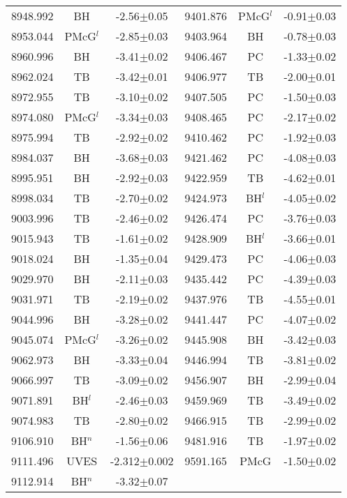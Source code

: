 \documentclass[a4paper,fleqn,usenatbib]{mnras}
\begin{document}
\begin{table}
\begin{tabular}{lcc|lcc}
8948.992 & BH     & -2.56$\pm$0.05   & 9401.876 &PMcG$^l$& -0.91$\pm$0.03   \\ 
8953.044 &PMcG$^l$& -2.85$\pm$0.03   & 9403.964 & BH     & -0.78$\pm$0.03   \\ 
8960.996 & BH     & -3.41$\pm$0.02   & 9406.467 & PC     & -1.33$\pm$0.02   \\ 
8962.024 & TB     & -3.42$\pm$0.01   & 9406.977 & TB     & -2.00$\pm$0.01   \\ 
8972.955 & TB     & -3.10$\pm$0.02   & 9407.505 & PC     & -1.50$\pm$0.03   \\ 
8974.080 &PMcG$^l$& -3.34$\pm$0.03   & 9408.465 & PC     & -2.17$\pm$0.02   \\ 
8975.994 & TB     & -2.92$\pm$0.02   & 9410.462 & PC     & -1.92$\pm$0.03   \\ 
8984.037 & BH     & -3.68$\pm$0.03   & 9421.462 & PC     & -4.08$\pm$0.03   \\ 
8995.951 & BH     & -2.92$\pm$0.03   & 9422.959 & TB     & -4.62$\pm$0.01   \\ 
8998.034 & TB     & -2.70$\pm$0.02   & 9424.973 & BH$^l$ & -4.05$\pm$0.02   \\ 
9003.996 & TB     & -2.46$\pm$0.02   & 9426.474 & PC     & -3.76$\pm$0.03   \\ 
9015.943 & TB     & -1.61$\pm$0.02   & 9428.909 & BH$^l$ & -3.66$\pm$0.01   \\ 
9018.024 & BH     & -1.35$\pm$0.04   & 9429.473 & PC     & -4.06$\pm$0.03   \\ 
9029.970 & BH     & -2.11$\pm$0.03   & 9435.442 & PC     & -4.39$\pm$0.03   \\ 
9031.971 & TB     & -2.19$\pm$0.02   & 9437.976 & TB     & -4.55$\pm$0.01   \\ 
9044.996 & BH     & -3.28$\pm$0.02   & 9441.447 & PC     & -4.07$\pm$0.02   \\ 
9045.074 &PMcG$^l$& -3.26$\pm$0.02   & 9445.908 & BH     & -3.42$\pm$0.03   \\ 
9062.973 & BH     & -3.33$\pm$0.04   & 9446.994 & TB     & -3.81$\pm$0.02   \\ 
9066.997 & TB     & -3.09$\pm$0.02   & 9456.907 & BH     & -2.99$\pm$0.04   \\ 
9071.891 & BH$^l$ & -2.46$\pm$0.03   & 9459.969 & TB     & -3.49$\pm$0.02   \\ 
9074.983 & TB     & -2.80$\pm$0.02   & 9466.915 & TB     & -2.99$\pm$0.02   \\ 
9106.910 & BH$^n$ & -1.56$\pm$0.06   & 9481.916 & TB     & -1.97$\pm$0.02   \\
9111.496 & UVES   & -2.312$\pm$0.002 & 9591.165 & PMcG   & -1.50$\pm$0.02   \\
9112.914 & BH$^n$ & -3.32$\pm$0.07   &  \\
\hline
  \end{tabular}
  \end{table}
\end{document}
